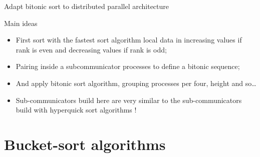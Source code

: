 \documentclass[compress,10pt,aspectratio=169]{beamer}
\begin{document}
    \begin{frame}{Adapt bitonic sort to distributed parallel architecture}
        \scriptsize
        \begin{block}{Main ideas}
            \begin{itemize}
                \item First sort with the fastest sort algorithm local data in increasing values if rank is even and decreasing values if rank is odd;
                \item Pairing inside a subcommunicator  processes to define a bitonic sequence;
                \item And apply bitonic sort algorithm, grouping processes per four, height and so\ldots
                \item Sub-communicators build here are very similar to the sub-communicators build with hyperquick sort algorithms !
            \end{itemize}
        \end{block}

    \end{frame}

\section{Bucket-sort algorithms}
\end{document}
